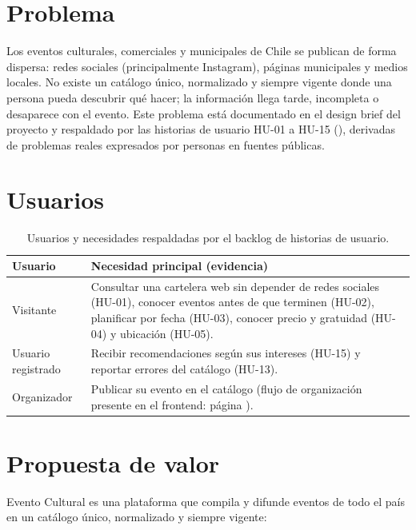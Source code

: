 \documentclass[11pt,a4paper]{article}
\begin{document}
\maketitlecapstone

\section{Problema}

Los eventos culturales, comerciales y municipales de Chile se publican de forma
dispersa: redes sociales (principalmente Instagram), páginas municipales y medios
locales. No existe un catálogo único, normalizado y siempre vigente donde una
persona pueda descubrir qué hacer; la información llega tarde, incompleta o
desaparece con el evento. Este problema está documentado en el design brief del
proyecto y respaldado por las historias de usuario HU-01 a HU-15
(), derivadas de problemas
reales expresados por personas en fuentes públicas.

\section{Usuarios}

\begin{table}[h!]
\centering\small
\begin{tabular}{@{}L{4.2cm}L{10.6cm}@{}}
\toprule
\textbf{Usuario} & \textbf{Necesidad principal (evidencia)} \\
\midrule
Visitante & Consultar una cartelera web sin depender de redes sociales (HU-01),
conocer eventos antes de que terminen (HU-02), planificar por fecha (HU-03),
conocer precio y gratuidad (HU-04) y ubicación (HU-05). \\
Usuario registrado & Recibir recomendaciones según sus intereses (HU-15) y
reportar errores del catálogo (HU-13). \\
Organizador & Publicar su evento en el catálogo (flujo de organización presente
en el frontend: página ). \\
\bottomrule
\end{tabular}
\caption{Usuarios y necesidades respaldadas por el backlog de historias de usuario.}
\end{table}

\section{Propuesta de valor}

Evento Cultural es una plataforma que compila y difunde eventos de todo el país
en un catálogo único, normalizado y siempre vigente:
\end{document}
